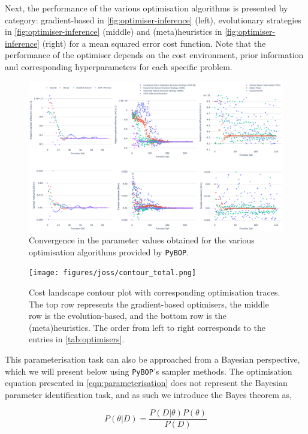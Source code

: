 \documentclass[
]{article}
\begin{document}
Next, the performance of the various optimisation algorithms is
presented by category: gradient-based in
\autoref{fig:optimiser-inference} (left), evolutionary strategies in
\autoref{fig:optimiser-inference} (middle) and (meta)heuristics in
\autoref{fig:optimiser-inference} (right) for a mean squared error cost
function. Note that the performance of the optimiser depends on the cost
environment, prior information and corresponding hyperparameters for
each specific problem.

\begin{figure}
\centering
\includegraphics[width=1\textwidth,height=\textheight]{figures/joss/optimisers_parameters.png}
\caption{Convergence in the parameter values obtained for the various
optimisation algorithms provided by \texttt{PyBOP}.
\label{fig:optimiser-inference}}
\end{figure}

\begin{figure}
\centering
\texttt{[image: figures/joss/contour\_total.png]}
\caption{Cost landscape contour plot with corresponding optimisation
traces. The top row represents the gradient-based optimisers, the middle
row is the evolution-based, and the bottom row is the (meta)heuristics.
The order from left to right corresponds to the entries in
\autoref{tab:optimisers}. \label{fig:optimiser-inference}}
\end{figure}

This parameterisation task can also be approached from a Bayesian
perspective, which we will present below using \texttt{PyBOP}'s sampler
methods. The optimisation equation presented in
\autoref{eqn:parameterisation} does not represent the Bayesian parameter
identification task, and as such we introduce the Bayes theorem as,

\begin{equation}
P(\theta|D) = \frac{P(D|\theta)P(\theta)}{P(D)}
\label{eqn:bayes_theorem}
\end{equation}
\end{document}
